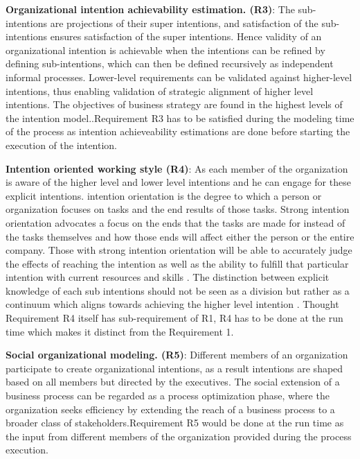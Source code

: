  \textbf{Organizational intention achievability estimation. (R3)}: The sub-intentions are projections of their super intentions, and satisfaction of the sub-intentions ensures satisfaction of the super intentions. Hence validity of an organizational intention is achievable when the intentions can be refined by defining sub-intentions, which can then be defined recursively as independent informal processes. Lower-level requirements can be validated against higher-level intentions, thus enabling validation of strategic alignment of  higher level intentions. The objectives of business strategy are found in the highest levels of the intention model.\cite{Bleistein2006}.Requirement R3 has to be satisfied during the modeling time of the process as intention achieveability estimations are done before starting the execution of the intention.

 \textbf{Intention oriented working style (R4)}: As each member of the organization is aware of the higher level and lower level intentions and he can engage for these explicit intentions. intention orientation is the degree to which a person or organization focuses on tasks and the end results of those tasks. Strong intention orientation advocates a focus on the ends that the tasks are made for instead of the tasks themselves and how those ends will affect either the person or the entire company. Those with strong intention orientation will be able to accurately judge the effects of reaching the intention as well as the ability to fulfill that particular intention with current resources and skills \cite{Lacom}. The distinction between explicit knowledge of each sub intentions should not be seen as a division but rather as a continuum which aligns towards achieving the higher level intention . Thought Requirement R4 itself has sub-requirement of R1, R4 has to be done at the run time which makes it distinct from the Requirement 1.

 \textbf{Social organizational modeling. (R5)}: Different members of an organization participate to create organizational intentions, as a result intentions are shaped based on all members but directed by the executives. The  social  extension  of  a  business  process  can  be  regarded  as  a  process optimization phase, where the organization seeks efficiency  by  extending  the  reach  of  a  business  process  to  a  broader  class  of  stakeholders\cite{Brambilla2012}.Requirement R5 would be done at the run time as the input from different members of the organization provided during the process execution.


